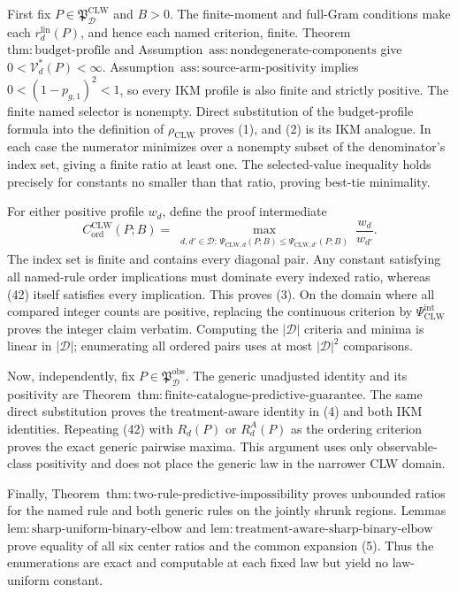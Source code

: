First fix \(P\in\mathfrak P_{\mathcal D}^{\mathrm{CLW}}\) and \(B>0\). The finite-moment and full-Gram conditions make each \(r_d^{\mathrm{lin}}(P)\), and hence each named criterion, finite. Theorem~\(\mathrm{thm{:}budget\text{-}profile}\) and Assumption~\(\mathrm{ass{:}nondegenerate\text{-}components}\) give \(0<\mathcal V_d^*(P)<\infty\). Assumption~\(\mathrm{ass{:}source\text{-}arm\text{-}positivity}\) implies \(0<(1-p_{g,1})^2<1\), so every IKM profile is also finite and strictly positive. The finite named selector is nonempty. Direct substitution of the budget-profile formula into the definition of \(\rho_{\mathrm{CLW}}\) proves (1), and (2) is its IKM analogue. In each case the numerator minimizes over a nonempty subset of the denominator's index set, giving a finite ratio at least one. The selected-value inequality holds precisely for constants no smaller than that ratio, proving best-tie minimality.

For either positive profile \(w_d\), define the proof intermediate
\[
 C_{\mathrm{ord}}^{\mathrm{CLW}}(P;B)
 =\max_{\substack{d,d'\in\mathcal D:\,
 \Psi_{\mathrm{CLW},d}(P;B)
 \le\Psi_{\mathrm{CLW},d'}(P;B)}}\frac{w_d}{w_{d'}}.       \tag{42}
\]
The index set is finite and contains every diagonal pair. Any constant satisfying all named-rule order implications must dominate every indexed ratio, whereas (42) itself satisfies every implication. This proves (3). On the domain where all compared integer counts are positive, replacing the continuous criterion by \(\Psi_{\mathrm{CLW}}^{\mathrm{int}}\) proves the integer claim verbatim. Computing the \(|\mathcal D|\) criteria and minima is linear in \(|\mathcal D|\); enumerating all ordered pairs uses at most \(|\mathcal D|^2\) comparisons.

Now, independently, fix \(P\in\mathfrak P_{\mathcal D}^{\mathrm{obs}}\). The generic unadjusted identity and its positivity are Theorem~\(\mathrm{thm{:}finite\text{-}catalogue\text{-}predictive\text{-}guarantee}\). The same direct substitution proves the treatment-aware identity in (4) and both IKM identities. Repeating (42) with \(R_d(P)\) or \(R_d^A(P)\) as the ordering criterion proves the exact generic pairwise maxima. This argument uses only observable-class positivity and does not place the generic law in the narrower CLW domain.

Finally, Theorem~\(\mathrm{thm{:}two\text{-}rule\text{-}predictive\text{-}impossibility}\) proves unbounded ratios for the named rule and both generic rules on the jointly shrunk regions. Lemmas~\(\mathrm{lem{:}sharp\text{-}uniform\text{-}binary\text{-}elbow}\) and \(\mathrm{lem{:}treatment\text{-}aware\text{-}sharp\text{-}binary\text{-}elbow}\) prove equality of all six center ratios and the common expansion (5). Thus the enumerations are exact and computable at each fixed law but yield no law-uniform constant.